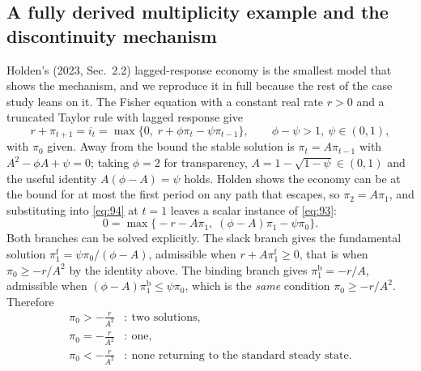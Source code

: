 \documentclass[11pt]{article}
\begin{document}
\subsection{A fully derived multiplicity example and the discontinuity mechanism}
\label{sec:nk-mult}

Holden's (2023, Sec.~2.2) lagged-response economy is the smallest model that
shows the mechanism, and we reproduce it in full because the rest of the
case study leans on it. The Fisher equation with a constant real rate $r>0$
and a truncated Taylor rule with lagged response give
\begin{equation}\label{eq:94}
 r+\pi_{t+1}=i_t=\max\{0,\;r+\phi\pi_t-\psi\pi_{t-1}\},
 \qquad \phi-\psi>1,\ \psi\in(0,1),
\end{equation}
with $\pi_0$ given. Away from the bound the stable solution is
$\pi_t=A\pi_{t-1}$ with $A^{2}-\phi A+\psi=0$; taking $\phi=2$ for
transparency, $A=1-\sqrt{1-\psi}\in(0,1)$ and the useful identity
$A(\phi-A)=\psi$ holds. Holden shows the economy can be at the bound for at
most the first period on any path that escapes, so $\pi_2=A\pi_1$, and
substituting into \eqref{eq:94} at $t=1$ leaves a scalar instance of
\eqref{eq:93}:
\begin{equation}\label{eq:95}
 0=\max\bigl\{-r-A\pi_1,\;(\phi-A)\pi_1-\psi\pi_0\bigr\}.
\end{equation}
Both branches can be solved explicitly. The slack branch gives the fundamental
solution $\pi_1^{\mathrm f}=\psi\pi_0/(\phi-A)$, admissible when
$r+A\pi_1^{\mathrm f}\geq0$, that is when $\pi_0\geq-r/A^{2}$ by the identity
above. The binding branch gives $\pi_1^{\mathrm b}=-r/A$, admissible when
$(\phi-A)\pi_1^{\mathrm b}\leq\psi\pi_0$, which is the \emph{same} condition
$\pi_0\geq-r/A^{2}$. Therefore
\begin{equation}\label{eq:96}
\begin{aligned}
 \pi_0>-\frac{r}{A^{2}}&:\ \text{two solutions},\\
 \pi_0=-\frac{r}{A^{2}}&:\ \text{one},\\
 \pi_0<-\frac{r}{A^{2}}&:\ \text{none returning to the standard steady state}.
\end{aligned}
\end{equation}
\end{document}
